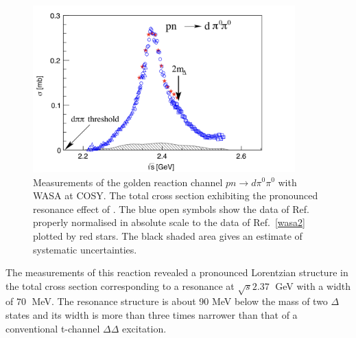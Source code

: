 \begin{figure}
    \centering
    \includegraphics[width=0.9\textwidth]{gfx/wasares1}
	\caption{Measurements of the golden reaction channel $pn \rightarrow d \pi^{0} \pi^{0}$ with WASA at COSY. The total cross section exhibiting the pronounced resonance effect of \dst. The blue open symbols show the data of Ref.~\cite{wasa1} properly normalised in absolute scale to the data of Ref.~\ref{wasa2} plotted by red stars. The black shaded area gives an estimate of systematic uncertainties.}
	\label{fig:wasares1}
\end{figure}

The measurements of this reaction revealed a pronounced Lorentzian structure in the total cross section
corresponding to a resonance at $\sqrt{s} 2.37\;$ GeV with a width of $70\;$ MeV. 
The resonance structure is about 90 MeV below the mass of two $\Delta$ states and its width is more 
than three times narrower than that of a conventional t-channel $\Delta\Delta$ excitation.



